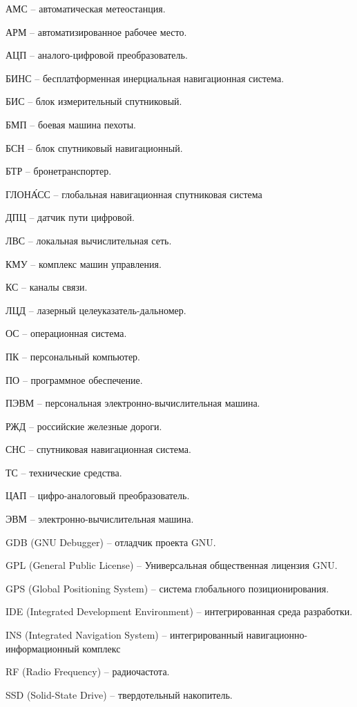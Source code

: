 \thispagestyle{empty}

АМС -- автоматическая метеостанция.

АРМ -- автоматизированное рабочее место.

АЦП -- аналого-цифровой преобразователь.

БИНС -- бесплатформенная инерциальная навигационная система.

БИС -- блок измерительный спутниковый.

БМП -- боевая машина пехоты.

БСН -- блок спутниковый навигационный.

БТР -- бронетранспортер.

ГЛОНА́СС -- глобальная навигационная спутниковая система

ДПЦ -- датчик пути цифровой.

ЛВС -- локальная вычислительная сеть.

КМУ -- комплекс машин управления.

КС -- каналы связи.

ЛЦД -- лазерный целеуказатель-дальномер.

ОС -- операционная система.

ПК -- персональный компьютер.

ПО -- программное обеспечение.

ПЭВМ -- персональная электронно-вычислительная машина.

РЖД -- российские железные дороги.

СНС -- спутниковая навигационная система.

ТС -- технические средства.

ЦАП -- цифро-аналоговый преобразователь.

ЭВМ -- электронно-вычислительная машина.

GDB (GNU Debugger) -- отладчик проекта GNU.

GPL (General Public License) -- Универсальная общественная лицензия GNU.

GPS (Global Positioning System) -- система глобального позиционирования.

IDE (Integrated Development Environment) -- интегрированная среда разработки.

INS (Integrated Navigation System) -- интегрированный навигационно-информационный комплекс

RF (Radio Frequency) -- радиочастота.

SSD (Solid-State Drive) -- твердотельный накопитель.
\clearpage
